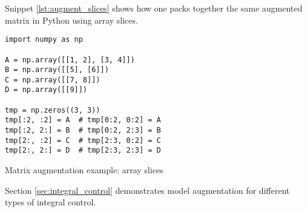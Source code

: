 Snippet \ref{lst:augment_slices} shows how one packs together the same augmented
matrix in Python using array slices.
\begin{code}
  \begin{lstlisting}[style=customPython]
import numpy as np

A = np.array([[1, 2], [3, 4]])
B = np.array([[5], [6]])
C = np.array([[7, 8]])
D = np.array([[9]])

tmp = np.zeros((3, 3))
tmp[:2, :2] = A  # tmp[0:2, 0:2] = A
tmp[:2, 2:] = B  # tmp[0:2, 2:3] = B
tmp[2:, :2] = C  # tmp[2:3, 0:2] = C
tmp[2:, 2:] = D  # tmp[2:3, 2:3] = D
  \end{lstlisting}
  \caption{Matrix augmentation example: array slices}
  \label{lst:augment_slices}
\end{code}

Section \ref{sec:integral_control} demonstrates \gls{model} augmentation for
different types of integral control.
